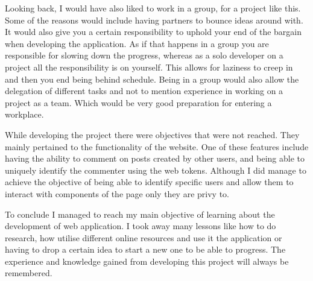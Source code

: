 Looking back, I would have also liked to work in a group, for a project like this. Some of the reasons would include having partners to bounce ideas around with. It would also give you a certain responsibility to uphold your end of the bargain when developing the application. As if that happens in a group you are responsible for slowing down the progress, whereas as a solo developer on a project all the responsibility is on yourself. This allows for laziness to creep in and then you end being behind schedule. Being in a group would also allow the delegation of different tasks and not to mention experience in working on a project as a team. Which would be very good preparation for entering a workplace.

While developing the project there were objectives that were not reached. They mainly pertained to the functionality of the website. One of these features include having the ability to comment on posts created by other users, and being able to uniquely identify the commenter using the web tokens. Although I did manage to achieve the objective of being able to identify specific users and allow them to interact with components of the page only they are privy to.

To conclude I managed to reach my main objective of learning about the development of web application. I took away many lessons like how to do research, how utilise different online resources and use it the application or having to drop a certain idea to start a new one to be able to progress. The experience and knowledge gained from developing this project will always be remembered.


